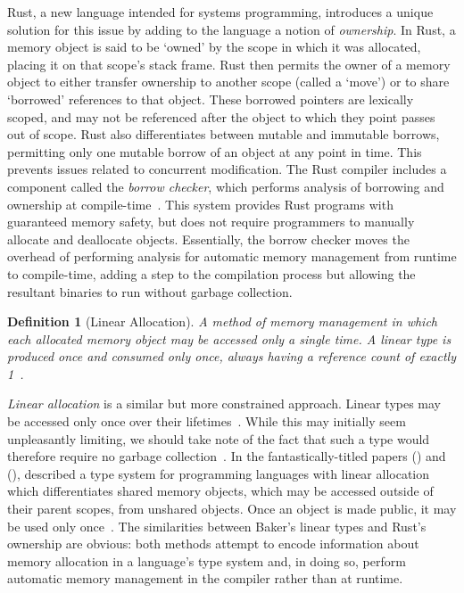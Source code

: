 \documentclass[11pt,a4paper]{article}
\theoremstyle{break}
\newtheorem{defn}{Definition}
\begin{document}
\label{subsec:rust}Rust, a new language intended for systems programming, introduces a unique solution for this issue by adding to the language a notion of \textit{ownership}. In Rust, a memory object is said to be `owned' by the scope in which it was allocated, placing it on that scope's stack frame. Rust then permits the owner of a memory object to either transfer ownership to another scope (called a `move') or to share `borrowed' references to that object. These borrowed pointers are lexically scoped, and may not be referenced after the object to which they point passes out of scope. Rust also differentiates between mutable and immutable borrows, permitting only one mutable borrow of an object at any point in time. This prevents issues related to concurrent modification. The Rust compiler includes a component called the \textit{borrow checker}, which performs analysis of borrowing and ownership at compile-time~\cite{Matsakis:2014:RL:2663171.2663188}. This system provides Rust programs with guaranteed memory safety, but does not require programmers to manually allocate and deallocate objects. Essentially, the borrow checker moves the overhead of performing analysis for automatic memory management from runtime to compile-time, adding a step to the compilation process but allowing the resultant binaries to run without garbage collection.

\begin{defn}[Linear Allocation]
A method of memory management in which each allocated memory object may be accessed only a single time. A linear type is produced once and consumed only once, always having a reference count of exactly 1~\cite{Baker:1992:LLL:142137.142162,hawblitzel2004low,Baker:1995:UVL:199818.199860}.
\end{defn}

\textit{Linear allocation} is a similar but more constrained approach. Linear types may be accessed only once over their lifetimes~\cite{Baker:1992:LLL:142137.142162,hawblitzel2004low,Baker:1995:UVL:199818.199860}. While this may initially seem unpleasantly limiting, we should take note of the fact that such a type would therefore require no garbage collection~\cite{Baker:1992:LLL:142137.142162,Baker:1995:UVL:199818.199860}. In the fantastically-titled papers  (\citeyear{Baker:1992:LLL:142137.142162}) and  (\citeyear{Baker:1995:UVL:199818.199860}), \citeauthor{Baker:1992:LLL:142137.142162} described a type system for programming languages with linear allocation which differentiates shared memory objects, which may be accessed outside of their parent scopes, from unshared objects. Once an object is made public, it may be used only once~\cite{Baker:1995:UVL:199818.199860,Baker:1992:LLL:142137.142162}. The similarities between Baker's linear types and Rust's ownership are obvious: both methods attempt to encode information about memory allocation in a language's type system and, in doing so, perform automatic memory management in the compiler rather than at runtime.
\end{document}

